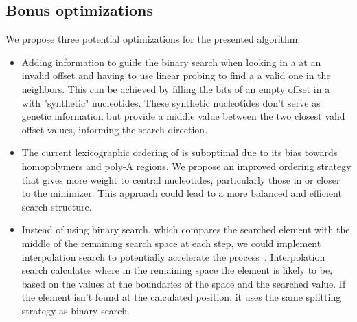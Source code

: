 \subsection*{Bonus optimizations}
We propose three potential optimizations for the presented algorithm:
\begin{itemize}
	\item Adding information to guide the binary search when looking in a \skmer at an invalid offset and having to use linear probing to find a a valid one in the neighbors. This can be achieved by filling the bits of an empty offset in a \skmer with "synthetic" nucleotides. These synthetic nucleotides don't serve as genetic information but provide a middle value between the two closest valid offset values, informing the search direction.
	\item The current lexicographic ordering of \skmers is suboptimal due to its bias towards homopolymers and poly-A regions. We propose an improved ordering strategy that gives more weight to central nucleotides, particularly those in or closer to the minimizer. This approach could lead to a more balanced and efficient search structure.
	\item Instead of using binary search, which compares the searched element with the middle of the remaining search space at each step, we could implement interpolation search to potentially accelerate the process~\cite{pla_complexity}. Interpolation search calculates where in the remaining space the element is likely to be, based on the values at the boundaries of the space and the searched value. If the element isn't found at the calculated position, it uses the same splitting strategy as binary search.
\end{itemize}

\printbibliography
